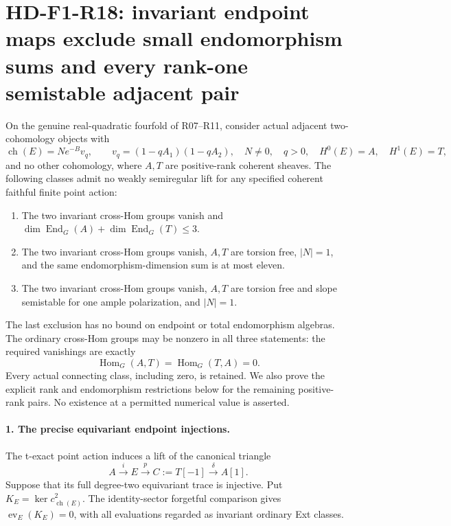 \section[HD-F1-R18: invariant nonsimple adjacent endpoints]{HD-F1-R18: invariant endpoint maps exclude small endomorphism sums and every rank-one semistable adjacent pair}
\label{sec:followup-rm-nonsimple-adjacent}

On the genuine real-quadratic fourfold of R07--R11,
consider actual adjacent two-cohomology objects with
\[
 \operatorname{ch}(E)=N e^{-B}v_q,\qquad
 v_q=(1-qA_1)(1-qA_2),\quad N\ne0,\quad q>0,
 \quad H^0(E)=A,\quad H^1(E)=T,
 \tag{F1R18.1}
\]
and no other cohomology, where $A,T$ are positive-rank
coherent sheaves. The following classes admit no weakly
semiregular lift for any specified coherent faithful
finite point action:
\begin{enumerate}
\item The two invariant cross-Hom groups vanish and
      $\dim\operatorname{End}_G(A)+
       \dim\operatorname{End}_G(T)\le3$.
\item The two invariant cross-Hom groups vanish,
      $A,T$ are torsion free, $|N|=1$, and the same
      endomorphism-dimension sum is at most eleven.
\item The two invariant cross-Hom groups vanish,
      $A,T$ are torsion free and slope semistable for
      one ample polarization, and $|N|=1$.
\end{enumerate}
The last exclusion has no bound on endpoint or total
endomorphism algebras. The ordinary cross-Hom groups
may be nonzero in all three statements: the required
vanishings are exactly
\[
              \operatorname{Hom}_G(A,T)=
              \operatorname{Hom}_G(T,A)=0.
 \tag{F1R18.2}
\]
Every actual connecting class, including zero, is retained.
We also prove the explicit rank and endomorphism restrictions
below for the remaining positive-rank pairs. No existence
at a permitted numerical value is asserted.

\paragraph{1. The precise equivariant endpoint injections.}
The t-exact point action induces a lift of the canonical
triangle
\[
       A\xrightarrow{i}E\xrightarrow{p}C:=T[-1]
                          \xrightarrow{\delta}A[1].
 \tag{F1R18.3}
\]
Suppose that its full degree-two equivariant trace is
injective. Put $K_E=\ker c^2_{\operatorname{ch}(E)}$.
The identity-sector forgetful comparison gives
$\operatorname{ev}_E(K_E)=0$, with all evaluations
regarded as invariant ordinary Ext classes.

